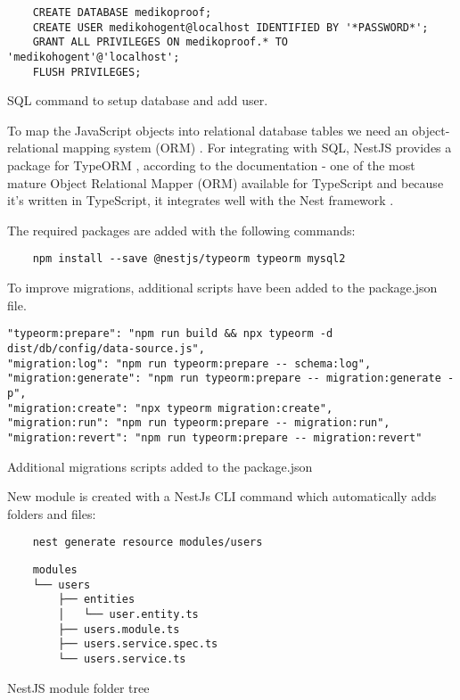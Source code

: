 \begin{listing}[H]
    \begin{verbatim}
    CREATE DATABASE medikoproof;
    CREATE USER medikohogent@localhost IDENTIFIED BY '*PASSWORD*';
    GRANT ALL PRIVILEGES ON medikoproof.* TO 'medikohogent'@'localhost';
    FLUSH PRIVILEGES;
    \end{verbatim}
\caption[SQL command to setup database and add user]{SQL command to setup database and add user.}
\end{listing}


To map the JavaScript objects into relational database tables we need an object-relational mapping system (ORM) \autocite{AmblerORM}. For integrating with SQL, NestJS provides a package for TypeORM \autocite{TypeORM}, according to the documentation - one of the most mature Object Relational Mapper (ORM) available for TypeScript and because it's written in TypeScript, it integrates well with the Nest framework \autocite{NestJsDoc}. 

The required packages are added with the following commands:

\begin{verbatim}
    npm install --save @nestjs/typeorm typeorm mysql2
\end{verbatim}

To improve migrations, additional scripts have been added to the package.json file.

\begin{listing}[H]
    \begin{verbatim}
"typeorm:prepare": "npm run build && npx typeorm -d dist/db/config/data-source.js",
"migration:log": "npm run typeorm:prepare -- schema:log",
"migration:generate": "npm run typeorm:prepare -- migration:generate -p",
"migration:create": "npx typeorm migration:create",
"migration:run": "npm run typeorm:prepare -- migration:run",
"migration:revert": "npm run typeorm:prepare -- migration:revert"
    \end{verbatim}
\caption[Migrations scripts]{Additional migrations scripts added to the package.json}
\end{listing}


New module is created with a NestJs CLI command which automatically adds folders and files:

\begin{verbatim}
    nest generate resource modules/users
\end{verbatim}

\begin{listing}[H]
    \begin{verbatim}
    modules
    └── users
        ├── entities
        │   └── user.entity.ts
        ├── users.module.ts
        ├── users.service.spec.ts
        └── users.service.ts
    \end{verbatim}
\caption[NestJS module folder tree]{NestJS module folder tree}
\end{listing}


